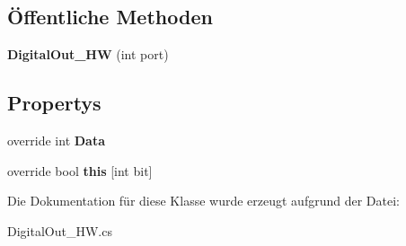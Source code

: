 \subsection*{Öffentliche Methoden}
\begin{DoxyCompactItemize}
\item 
\hypertarget{class_robot_ctrl_1_1_digital_out___h_w_ae26dd8f2e439fa83f3afb1c8fad3e266}{
{\bfseries DigitalOut\_\-HW} (int port)}
\label{class_robot_ctrl_1_1_digital_out___h_w_ae26dd8f2e439fa83f3afb1c8fad3e266}

\end{DoxyCompactItemize}
\subsection*{Propertys}
\begin{DoxyCompactItemize}
\item 
\hypertarget{class_robot_ctrl_1_1_digital_out___h_w_ae374c259f09079b63f2bb6533e6ce5de}{
override int {\bfseries Data}}
\label{class_robot_ctrl_1_1_digital_out___h_w_ae374c259f09079b63f2bb6533e6ce5de}

\item 
\hypertarget{class_robot_ctrl_1_1_digital_out___h_w_a76f77544e88287efb3b2f273429b2ff0}{
override bool {\bfseries this} \mbox{[}int bit\mbox{]}}
\label{class_robot_ctrl_1_1_digital_out___h_w_a76f77544e88287efb3b2f273429b2ff0}

\end{DoxyCompactItemize}


Die Dokumentation für diese Klasse wurde erzeugt aufgrund der Datei:\begin{DoxyCompactItemize}
\item 
DigitalOut\_\-HW.cs\end{DoxyCompactItemize}
